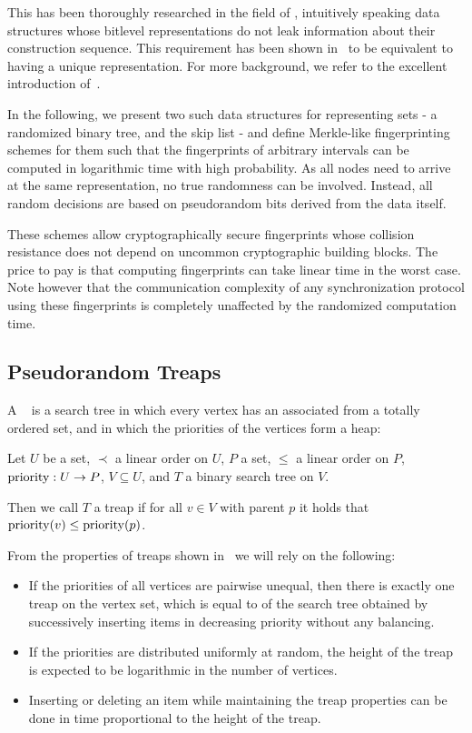 This has been thoroughly researched in the field of , intuitively speaking data structures whose bitlevel representations do not leak information about their construction sequence. This requirement has been shown in~\cite{hartline2005characterizing} to be equivalent to having a unique representation. For more background, we refer to the excellent introduction of~\cite{bender2016anti}.

In the following, we present two such data structures for representing sets - a randomized binary tree, and the skip list - and define Merkle-like fingerprinting schemes for them such that the fingerprints of arbitrary intervals can be computed in logarithmic time with high probability. As all nodes need to arrive at the same representation, no true randomness can be involved. Instead, all random decisions are based on pseudorandom bits derived from the data itself.

These schemes allow cryptographically secure fingerprints whose collision resistance does not depend on uncommon cryptographic building blocks. The price to pay is that computing fingerprints can take linear time in the worst case. Note however that the communication complexity of any synchronization protocol using these fingerprints is completely unaffected by the randomized computation time.

\subsection{Pseudorandom Treaps}

A ~\cite{seidel1996randomized} is a search tree in which every vertex has an associated  from a totally ordered set, and in which the priorities of the vertices form a heap:

\begin{definition}
Let $U$ be a set, $\prec$ a linear order on $U$, $P$ a set, $\leq$ a linear order on $P$, ${\operatorname{priority}}: {U} \rightarrow {P}$, $V \subseteq U$, and $T$ a binary search tree on $V$.

Then we call $T$ a treap if for all $v \in V$ with parent $p$ it holds that $\operatorname{priority}(v) \leq \operatorname{priority}(p)$.
\end{definition}

From the properties of treaps shown in~\cite{seidel1996randomized} we will rely on the following:

\begin{itemize}
  \item If the priorities of all vertices are pairwise unequal, then there is exactly one treap on the vertex set, which is equal to of the search tree obtained by successively inserting items in decreasing priority without any balancing.
  \item If the priorities are distributed uniformly at random, the height of the treap is expected to be logarithmic in the number of vertices.
  \item Inserting or deleting an item while maintaining the treap properties can be done in time proportional to the height of the treap.
\end{itemize}

